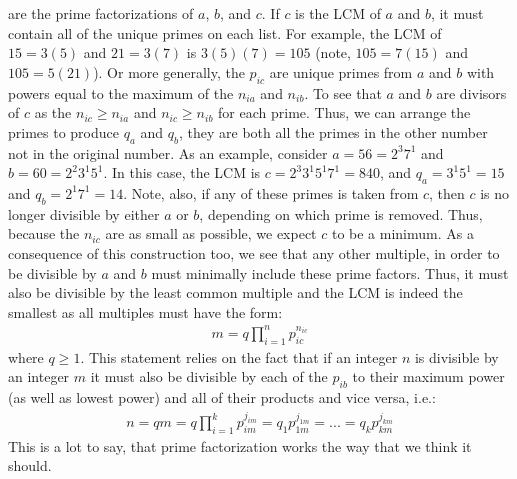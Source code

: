 \documentclass{article}
\begin{document}
are the prime factorizations of $a$, $b$, and $c$. If $c$ is the LCM of $a$ and $b$, it must contain all of the unique primes on each list. For example, the LCM of $15 = 3(5)$ and $21 = 3(7)$ is $3(5)(7) = 105$ (note, $105 = 7(15)$ and $105 = 5(21)$). Or more generally, the $p_{ic}$ are unique primes from $a$ and $b$ with powers equal to the maximum of the $n_{ia}$ and $n_{ib}$. To see that $a$ and $b$ are divisors of $c$ as the $n_{ic} \ge n_{ia}$ and $n_{ic} \ge n_{ib}$ for each prime. Thus, we can arrange the primes to produce $q_{a}$ and $q_{b}$, they are both all the primes in the other number not in the original number. As an example, consider $a = 56 = 2^{3}7^{1}$ and $b = 60 = 2^{2}3^{1}5^{1}$. In this case, the LCM is $c = 2^{3}3^{1}5^{1}7^{1} = 840$, and $q_{a} = 3^{1}5^{1} = 15$ and $q_{b} = 2^{1}7^{1} = 14$. Note, also, if any of these primes is taken from $c$, then $c$ is no longer divisible by either $a$ or $b$, depending on which prime is removed. Thus, because the $n_{ic}$ are as small as possible, we expect $c$ to be a minimum. As a consequence of this construction too, we see that any other multiple, in order to be divisible by $a$ and $b$ must minimally include these prime factors. Thus, it must also be divisible by the least common multiple and the LCM is indeed the smallest as all multiples must have the form:
\begin{gather*}
	m = q\prod_{i = 1}^{n}p_{ic}^{n_{ic}}
\end{gather*}
where $q \ge 1$. This statement relies on the fact that if an integer $n$ is divisible by an integer $m$ it must also be divisible by each of the $p_{ib}$ to their maximum power (as well as lowest power) and all of their products and vice versa, i.e.:
\begin{gather*}
	n = qm = q\prod_{i = 1}^{k}p_{im}^{j_{im}} = q_{1}p_{1m}^{j_{1m}} = ... = q_{k}p_{km}^{j_{km}}
\end{gather*}
This is a lot to say, that prime factorization works the way that we think it should.
\end{document}
